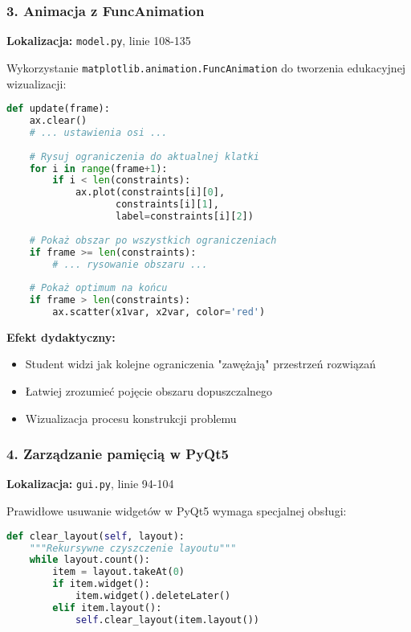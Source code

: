 \documentclass[12pt,a4paper]{article}
\begin{document}
\begin{enumerate}
\subsubsection{3. Animacja z FuncAnimation}

\textbf{Lokalizacja:} \texttt{model.py}, linie 108-135

Wykorzystanie \texttt{matplotlib.animation.FuncAnimation} do tworzenia edukacyjnej wizualizacji:

\begin{lstlisting}[language=Python]
def update(frame):
    ax.clear()
    # ... ustawienia osi ...
    
    # Rysuj ograniczenia do aktualnej klatki
    for i in range(frame+1):
        if i < len(constraints):
            ax.plot(constraints[i][0], 
                   constraints[i][1], 
                   label=constraints[i][2])
    
    # Pokaż obszar po wszystkich ograniczeniach
    if frame >= len(constraints):
        # ... rysowanie obszaru ...
    
    # Pokaż optimum na końcu
    if frame > len(constraints):
        ax.scatter(x1var, x2var, color='red')
\end{lstlisting}

\textbf{Efekt dydaktyczny:}
\begin{itemize}
    \item Student widzi jak kolejne ograniczenia "zawężają" przestrzeń rozwiązań
    \item Łatwiej zrozumieć pojęcie obszaru dopuszczalnego
    \item Wizualizacja procesu konstrukcji problemu
\end{itemize}

\subsubsection{4. Zarządzanie pamięcią w PyQt5}

\textbf{Lokalizacja:} \texttt{gui.py}, linie 94-104

Prawidłowe usuwanie widgetów w PyQt5 wymaga specjalnej obsługi:

\begin{lstlisting}[language=Python]
def clear_layout(self, layout):
    """Rekursywne czyszczenie layoutu"""
    while layout.count():
        item = layout.takeAt(0)
        if item.widget():
            item.widget().deleteLater()
        elif item.layout():
            self.clear_layout(item.layout())
\end{lstlisting}


\end{enumerate}
\end{document}
